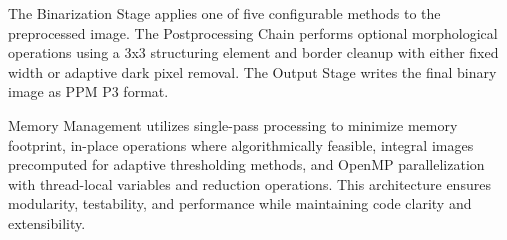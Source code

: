 The Binarization Stage applies one of five configurable methods to the preprocessed image. The Postprocessing Chain performs optional morphological operations using a 3x3 structuring element and border cleanup with either fixed width or adaptive dark pixel removal. The Output Stage writes the final binary image as PPM P3 format.

Memory Management utilizes single-pass processing to minimize memory footprint, in-place operations where algorithmically feasible, integral images precomputed for adaptive thresholding methods, and OpenMP parallelization with thread-local variables and reduction operations. This architecture ensures modularity, testability, and performance while maintaining code clarity and extensibility.




